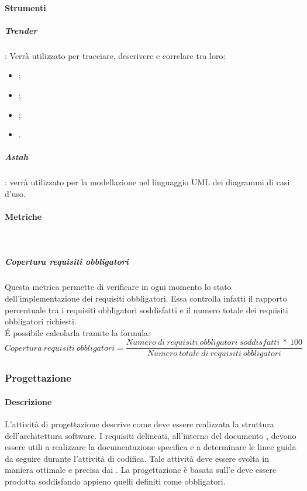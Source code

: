 \documentclass[../NormeDiProgetto_v3.0.0.tex]{subfiles}
\begin{document}
			\paragraph{Strumenti}
				\subparagraph{Trender}: Verrà utilizzato per tracciare, descrivere e correlare tra loro:
					\begin{itemize}
						\item {};
						\item {};
						\item {};
						\item {}.
					\end{itemize}
				\subparagraph{Astah}: verrà utilizzato per la modellazione nel linguaggio UML dei diagrammi di casi d'uso.

			\paragraph{Metriche}\mbox{}\\
				\subparagraph{Copertura requisiti obbligatori}
					Questa metrica permette di verificare in ogni momento lo stato dell'implementazione dei requisiti obbligatori. Essa controlla infatti il rapporto percentuale tra i requisiti obbligatori soddisfatti e il numero totale dei requisiti obbligatori richiesti.\\
					É possibile calcolarla tramite la formula:
					\begin{equation*}
						Copertura \ requisiti \ obbligatori = \frac{Numero \ di \ requisiti \ obbligatori \ soddisfatti \ * \ 100}{Numero \ totale \ di \ requisiti \ obbligatori}
					\end{equation*}

	\subsubsection{Progettazione}
		\paragraph{Descrizione}
		L'attività di progettazione descrive come deve essere realizzata la struttura dell'architettura software. I requisiti delineati, all'interno del documento \analisideirequisiti, devono essere utili a realizzare la documentazione specifica e a determinare le linee guida da seguire durante l'attività di codifica. Tale attività deve essere svolta in maniera ottimale e precisa dai \progettisti.
		La progettazione è basata sull'\analisideirequisiti e deve essere prodotta soddisfando appieno quelli definiti come obbligatori.
		
\end{document}
